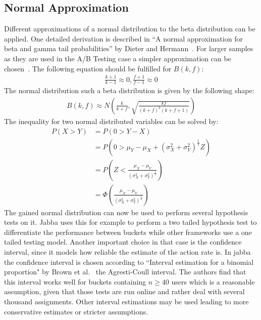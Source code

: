 \documentclass[../Thesis.tex]{subfiles}
\begin{document}
\subsection{Normal Approximation}\label{ssec:normal_approx}
Different approximations of a normal distribution to the beta distribution can be applied. One detailed derivation is described in ``A normal approximation for beta and gamma tail probabilities'' by Dieter and Hermann~\cite{alfers1984normal}. For larger samples as they are used in the A/B Testing case a simpler approximation can be chosen~\cite{epix}. The following equation should be fulfilled for $B(k,f)$:
\begin{align*}
\frac{k + 1}{k - 1}\approx 0,
\frac{f + 1}{f - 1}\approx 0
\end{align*}
The normal distribution such a beta distribution is given by the following shape:
\begin{align*}
B(k,f)\approx N\left(\frac{k}{k+f},\sqrt{\frac{kf}{(k+f)^2(k+f+1)}} \right)
\end{align*}
The inequality for two normal distributed variables can be solved by:
\begin{align*}
P(X>Y)	&= P(0 > Y - X) \\
			&= P(0 > \mu_Y - \mu_X + (\sigma_X^2 + \sigma_Y^2)^{\frac{1}{2}}Z) \\
			&= P\left(Z < \frac{\mu_X - \mu_Y}{\left(\sigma_X^2 + \sigma_Y^2\right)^{\frac{1}{2}}}\right) \\
			&= \Phi\left(\frac{\mu_X - \mu_Y}{\left(\sigma_X^2 + \sigma_Y^2\right)^{\frac{1}{2}}}\right)
\end{align*}
The gained normal distribution can now be used to perform several hypothesis tests on it. Jabba uses this for example to perform a two tailed hypothesis test to differentiate the performance between buckets while other frameworks use a one tailed testing model. Another important choice in that case is the confidence interval, since it models how reliable the estimate of the action rate is. In jabba the confidence interval is chosen according to ``Interval estimation for a binomial proportion" by Brown et al.~\cite{brown2001interval} the Agresti-Coull interval. The authors find that this interval works well for buckets containing $n \geq 40$ users which is a reasonable assumption, given that those tests are run online and rather deal with several thousand assignments. Other interval estimations may be used leading to more conservative estimates or stricter assumptions.
\end{document}
